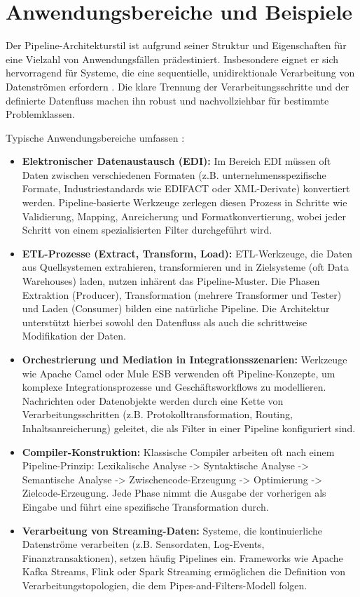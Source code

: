 \documentclass[11pt, a4paper]{article}
\begin{document}
\section{Anwendungsbereiche und Beispiele}

Der Pipeline-Architekturstil ist aufgrund seiner Struktur und Eigenschaften für eine Vielzahl von Anwendungsfällen prädestiniert. Insbesondere eignet er sich hervorragend für Systeme, die eine sequentielle, unidirektionale Verarbeitung von Datenströmen erfordern \cite{RichardsFord2020}. Die klare Trennung der Verarbeitungsschritte und der definierte Datenfluss machen ihn robust und nachvollziehbar für bestimmte Problemklassen.

Typische Anwendungsbereiche umfassen \cite{RichardsFord2020}:

\begin{itemize}
    \item \textbf{Elektronischer Datenaustausch (EDI):} Im Bereich EDI müssen oft Daten zwischen verschiedenen Formaten (z.B. unternehmensspezifische Formate, Industriestandards wie EDIFACT oder XML-Derivate) konvertiert werden. Pipeline-basierte Werkzeuge zerlegen diesen Prozess in Schritte wie Validierung, Mapping, Anreicherung und Formatkonvertierung, wobei jeder Schritt von einem spezialisierten Filter durchgeführt wird.
    \item \textbf{ETL-Prozesse (Extract, Transform, Load):} ETL-Werkzeuge, die Daten aus Quellsystemen extrahieren, transformieren und in Zielsysteme (oft Data Warehouses) laden, nutzen inhärent das Pipeline-Muster. Die Phasen Extraktion (Producer), Transformation (mehrere Transformer und Tester) und Laden (Consumer) bilden eine natürliche Pipeline. Die Architektur unterstützt hierbei sowohl den Datenfluss als auch die schrittweise Modifikation der Daten.
    \item \textbf{Orchestrierung und Mediation in Integrationsszenarien:} Werkzeuge wie Apache Camel oder Mule ESB verwenden oft Pipeline-Konzepte, um komplexe Integrationsprozesse und Geschäftsworkflows zu modellieren. Nachrichten oder Datenobjekte werden durch eine Kette von Verarbeitungsschritten (z.B. Protokolltransformation, Routing, Inhaltsanreicherung) geleitet, die als Filter in einer Pipeline konfiguriert sind.
    \item \textbf{Compiler-Konstruktion:} Klassische Compiler arbeiten oft nach einem Pipeline-Prinzip: Lexikalische Analyse -> Syntaktische Analyse -> Semantische Analyse -> Zwischencode-Erzeugung -> Optimierung -> Zielcode-Erzeugung. Jede Phase nimmt die Ausgabe der vorherigen als Eingabe und führt eine spezifische Transformation durch.
    \item \textbf{Verarbeitung von Streaming-Daten:} Systeme, die kontinuierliche Datenströme verarbeiten (z.B. Sensordaten, Log-Events, Finanztransaktionen), setzen häufig Pipelines ein. Frameworks wie Apache Kafka Streams, Flink oder Spark Streaming ermöglichen die Definition von Verarbeitungstopologien, die dem Pipes-and-Filters-Modell folgen.
\end{itemize}
\end{document}
